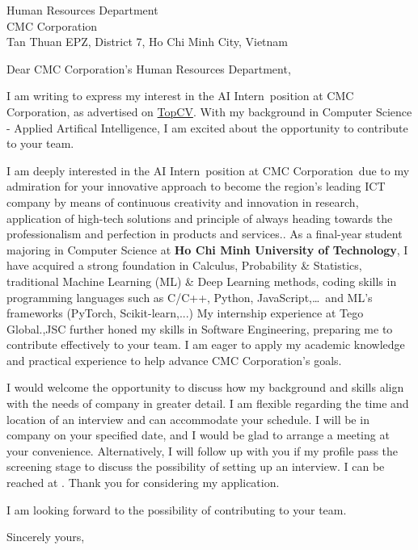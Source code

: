 \documentclass[
	parskip=half, %
	enlargefirstpage=true, %
]{scrlttr2} %
\newcommand{\TOHRNAME}{}
\newcommand{\TOPOSITION}{Human Resources Department}
\newcommand{\TOCOMPANY}{CMC Corporation}
\newcommand{\TOLOCATION}{Tan Thuan  EPZ, District 7, Ho Chi Minh City, Vietnam}
\newcommand{\COMPANYSERVICE}{become the region's leading ICT company by means of continuous creativity and innovation in research, application of high-tech solutions and principle of always heading towards the professionalism and perfection in products and services.}
\newcommand{\JOBTITLE}{AI Intern}
\newcommand{\COMPANY}{\TOCOMPANY}
\newcommand{\JOBBOARD}{\href{https://www.topcv.vn/viec-lam/internship-ai-engineer/1499918.html?ta_source=ITJobs_LinkDetail}{TopCV}}
\newcommand{\MYFIELD}{Computer Science - Applied Artifical Intelligence}
\begin{document}

\begin{letter}{
	\TOPOSITION \\
	\TOCOMPANY \\
	\TOLOCATION
}

\opening{Dear \TOCOMPANY's \TOPOSITION,}

I am writing to express my interest in the \JOBTITLE\ position at \COMPANY, as advertised on \JOBBOARD. With my background in \MYFIELD, I am excited about the opportunity to contribute to your team.

I am deeply interested in the \JOBTITLE\ position at \COMPANY\ due to my admiration for your innovative approach to \COMPANYSERVICE. As a final-year student majoring in Computer Science at \textbf{Ho Chi Minh University of Technology}, I have acquired a strong foundation in Calculus, Probability \& Statistics, traditional Machine Learning (ML) \& Deep Learning methods, coding skills in programming languages such as C/C++, Python, JavaScript,\dots\ and ML's frameworks (PyTorch, Scikit-learn,...)  My internship experience at Tego Global.,JSC further honed my skills in Software Engineering, preparing me to contribute effectively to your team. I am eager to apply my academic knowledge and practical experience to help advance \COMPANY's goals.

I would welcome the opportunity to discuss how my background and skills align with the needs of company in greater detail. I am flexible regarding the time and location of an interview and can accommodate your schedule. I will be in company on your specified date, and I would be glad to arrange a meeting at your convenience. Alternatively, I will follow up with you if my profile pass the screening stage to discuss the possibility of setting up an interview. I can be reached at . Thank you for considering my application.

I am looking forward to the possibility of contributing to your team.

Sincerely yours, \\


\end{letter}
\end{document}
